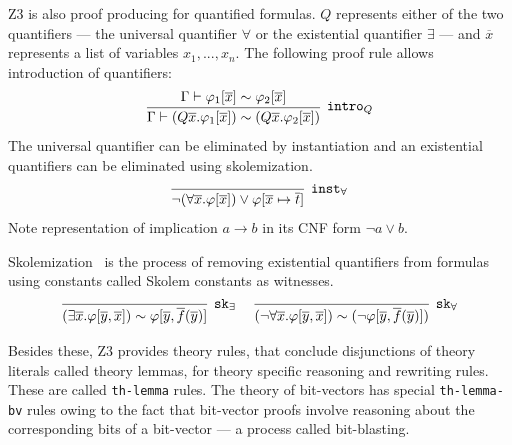 \documentclass{article}
\begin{document}
		Z3 is also proof producing for quantified formulas.
		$Q$ represents either of the two quantifiers --- 
		the universal quantifier $\forall$ or the 
		existential quantifier $\exists$ --- and 
		$\overline{x}$ represents a list of variables 
		$x_1,...,x_n$. The following 
		proof rule allows introduction of quantifiers:
		\begin{equation*}
			\infer[\texttt{intro$_Q$}]
			{\Gamma \vdash (Q \overline{x}.\varphi_1 [ \overline{x}]) \sim (Q \overline{x}.\varphi_2 [ \overline{x}])}
			{\Gamma \vdash \varphi_1 [\overline{x}] \sim \varphi_2 [\overline{x}]}
		\end{equation*}
		The universal quantifier can be eliminated by 
		instantiation and an existential quantifiers 
		can be eliminated using skolemization.
		\begin{equation*}
		\infer[\texttt{inst$_\forall$}]
			{\neg(\forall\overline{x}.\varphi[\overline{x}])
			\lor \varphi[\overline{x} \mapsto \overline{t}]}
			{}
		\end{equation*}
		Note representation of implication $a \to b$ in its 
		CNF form $\neg a \lor b$.
		
		Skolemization~\cite{NONNENGART2001335} is the process 
		of removing existential quantifiers from formulas using 
		constants called Skolem constants as witnesses.
		\begin{equation*}
		\infer[\texttt{sk$_\exists$}]
			{(\exists\overline{x}.\varphi[\overline{y},\overline{x}]) 
			\sim \varphi[\overline{y},\overline{f}(\overline{y})]}
			{}\ \ \ \ 
		\infer[\texttt{sk$_\forall$}]
		{(\neg\forall\overline{x}.\varphi[\overline{y},\overline{x}]) 
			\sim (\neg \varphi[\overline{y},\overline{f}(\overline{y})])}
		{}	
		\end{equation*}
		
		Besides these, Z3 provides theory rules, 
		that conclude disjunctions of theory literals 
		called theory lemmas, for theory specific reasoning
		and rewriting rules. These are called 
		\texttt{th-lemma} rules. The theory of bit-vectors
		has special \texttt{th-lemma-bv} rules owing to 
		the fact that bit-vector proofs involve reasoning 
		about the corresponding bits of a bit-vector --- 
		a process called bit-blasting. 
		
\end{document}
